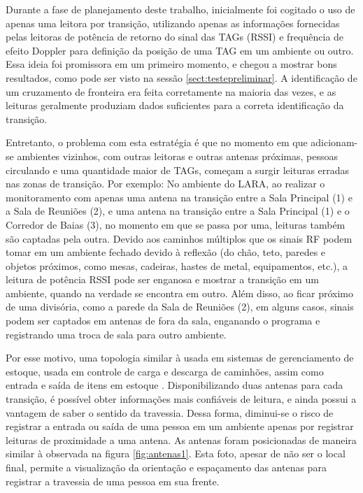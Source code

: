  Durante a fase de planejamento deste trabalho, inicialmente foi cogitado o uso de apenas uma leitora por transição, utilizando apenas as informações fornecidas pelas leitoras de potência de retorno do sinal das TAGs (RSSI) e frequência de efeito Doppler para definição da posição de uma TAG em um ambiente ou outro. Essa ideia foi promissora em um primeiro momento, e chegou a mostrar bons resultados, como pode ser visto na sessão \ref{sect:testepreliminar}. A identificação de um cruzamento de fronteira era feita corretamente na maioria das vezes, e as leituras geralmente produziam dados suficientes para a correta identificação da transição.
 
 Entretanto, o problema com esta estratégia é que no momento em que adicionam-se ambientes vizinhos, com outras leitoras e outras antenas próximas, pessoas circulando e uma quantidade maior de TAGs, começam a surgir leituras erradas nas zonas de transição. Por exemplo: No ambiente do LARA, ao realizar o monitoramento com apenas uma antena na transição entre a Sala Principal (1) e a Sala de Reuniões (2), e uma antena na transição entre a Sala Principal (1) e o Corredor de Baias (3), no momento em que se passa por uma, leituras também são captadas pela outra. Devido aos caminhos múltiplos que os sinais RF podem tomar em um ambiente fechado devido à reflexão (do chão, teto, paredes e objetos próximos, como mesas, cadeiras, hastes de metal, equipamentos, etc.), a leitura de potência RSSI pode ser enganosa e mostrar a transição em um ambiente, quando na verdade se encontra em outro. Além disso, ao ficar próximo de uma divisória, como a parede da Sala de Reuniões (2), em alguns casos, sinais podem ser captados em antenas de fora da sala, enganando o programa e registrando uma troca de sala para outro ambiente.
 
 Por esse motivo, uma topologia similar à usada em sistemas de gerenciamento de estoque, usada em controle de carga e descarga de caminhões, assim como entrada e saída de itens em estoque \cite{PortalRFID}. Disponibilizando duas antenas para cada transição, é possível obter informações mais confiáveis de leitura, e ainda possui a vantagem de saber o sentido da travessia. Dessa forma, diminui-se o risco de registrar a entrada ou saída de uma pessoa em um ambiente apenas por registrar leituras de proximidade a uma antena. As antenas foram posicionadas de maneira similar à observada na figura \ref{fig:antenas1}. Esta foto, apesar de não ser o local final, permite a visualização da orientação e espaçamento das antenas para registrar a travessia de uma pessoa em sua frente.
 
